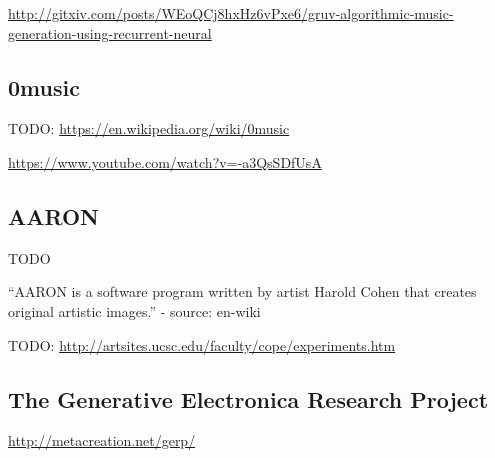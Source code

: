 \href{http://gitxiv.com/posts/WEoQCj8hxHz6vPxe6/gruv-algorithmic-music-generation-using-recurrent-neural}{http://gitxiv.com/posts/WEoQCj8hxHz6vPxe6/gruv-algorithmic-music-generation-using-recurrent-neural}

\subsection{0music}
TODO: \href{https://en.wikipedia.org/wiki/0music}{https://en.wikipedia.org/wiki/0music}

\href{https://www.youtube.com/watch?v=-a3QsSDfUsA}{https://www.youtube.com/watch?v=-a3QsSDfUsA}


\subsection{AARON}

TODO

\enquote{AARON is a software program written by artist Harold Cohen that creates original artistic images.} - source: en-wiki

TODO: \href{http://artsites.ucsc.edu/faculty/cope/experiments.htm}{http://artsites.ucsc.edu/faculty/cope/experiments.htm}


\subsection{The Generative Electronica Research Project}

\href{http://metacreation.net/gerp/}{http://metacreation.net/gerp/}
